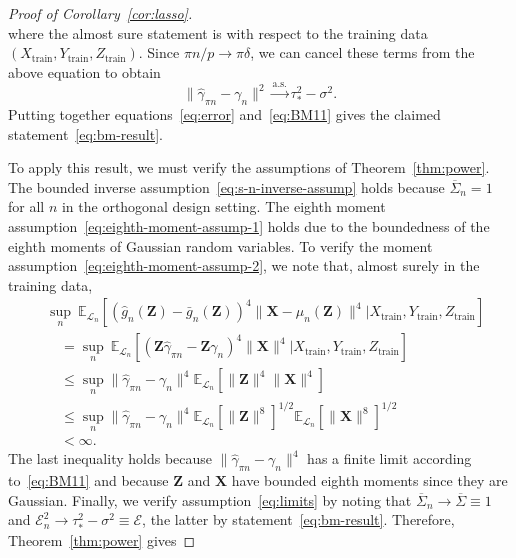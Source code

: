 \documentclass[12pt]{article}
\theoremstyle{definition}
\theoremstyle{remark}
\newcommand{\prx}{\bm X}
\newcommand{\srx}{X}
\newcommand{\prz}{\bm Z}
\newcommand{\srz}{Z}
\newcommand{\sry}{Y}
\begin{document}
\begin{proof}[Proof of Corollary~\ref{cor:lasso}]
\begin{equation}
\end{equation}
where the almost sure statement is with respect to the training data $(\srx_{\text{train}}, \sry_{\text{train}}, \srz_{\text{train}})$. Since $\pi n/p \rightarrow \pi \delta$, we can cancel these terms from the above equation to obtain
\begin{equation}
	\|\widehat \gamma_{\pi n} - \gamma_n\|^2 \overset{\text{a.s.}}\rightarrow \tau_*^2 - \sigma^2.
	\label{eq:BM11}
\end{equation}
Putting together equations~\eqref{eq:error} and~\eqref{eq:BM11} gives the claimed statement~\eqref{eq:bm-result}. 

To apply this result, we must verify the assumptions of Theorem~\ref{thm:power}. The bounded inverse assumption~\eqref{eq:s-n-inverse-assump} holds because $\overline \Sigma_n = 1$ for all $n$ in the orthogonal design setting. The eighth moment assumption~\eqref{eq:eighth-moment-assump-1} holds due to the boundedness of the eighth moments of Gaussian random variables. To verify the moment assumption~\eqref{eq:eighth-moment-assump-2}, we note that, almost surely in the training data,
\begin{equation*}
\begin{split}
&\sup_n\ \mathbb E_{\mathcal L_n}[(\widehat g_n(\prz)-\bar g_n(\prz))^4\|\prx - \mu_n(\prz)\|^4|\srx_{\text{train}}, \sry_{\text{train}}, \srz_{\text{train}}] \\
&\quad= \sup_n\ \mathbb E_{\mathcal L_n}[(\prz \widehat \gamma_{\pi n} - \prz \gamma_n)^4\|\prx\|^4|\srx_{\text{train}}, \sry_{\text{train}}, \srz_{\text{train}}] \\
&\quad\leq \sup_n\|\widehat \gamma_{\pi n} - \gamma_n\|^4  \mathbb E_{\mathcal L_n}[\|\prz\|^4\|\prx\|^4] \\
&\quad\leq \sup_n\|\widehat \gamma_{\pi n} - \gamma_n\|^4  \mathbb E_{\mathcal L_n}[\|\prz\|^8]^{1/2} \mathbb E_{\mathcal L_n}[\|\prx\|^8]^{1/2} \\
&\quad < \infty.
\end{split}
\end{equation*}
The last inequality holds because $\|\widehat \gamma_{\pi n} - \gamma_n\|^4$ has a finite limit according to~\eqref{eq:BM11} and because $\prz$ and $\prx$ have bounded eighth moments since they are Gaussian. Finally, we verify assumption~\eqref{eq:limits} by noting that $\overline \Sigma_n\rightarrow \overline \Sigma \equiv 1$ and $\mathcal E_n^2 \rightarrow \tau_*^2 - \sigma^2 \equiv \mathcal E$, the latter by statement~\eqref{eq:bm-result}. Therefore, Theorem~\ref{thm:power} gives 

\end{proof}
\end{document}

